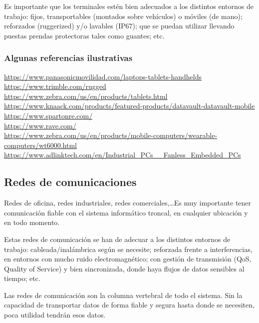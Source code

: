 \documentclass[spanish,12pt,a4paper,final,oneside]{book}
\begin{document}
Es importante que los terminales estén bien adecuados a los distintos entornos de trabajo: fijos, transportables (montados sobre vehículos) o móviles (de mano); reforzados (ruggerized) y/o lavables (IP67); que se puedan utilizar llevando puestas prendas protectoras tales como guantes; etc.

\subsubsection*{Algunas referencias ilustrativas}
\url{https://www.panasonicmovilidad.com/laptops-tablets-handhelds}
\\ \url{https://www.trimble.com/rugged}
\\ \url{https://www.zebra.com/us/en/products/tablets.html}
\\ \url{https://www.knaack.com/products/featured-products/datavault-datavault-mobile}
\\ \url{https://www.spartonre.com/}
\\ \url{https://www.rave.com/}
\\ \url{https://www.zebra.com/us/en/products/mobile-computers/wearable-computers/wt6000.html}
\\ \url{https://www.adlinktech.com/en/Industrial_PCs__Fanless_Embedded_PCs}

\subsection{Redes de comunicaciones} \label{redes_de_comunicaciones}
Redes de oficina, redes industriales, redes comerciales,\ldots Es muy importante tener comunicación fiable con el sistema informático troncal, en cualquier ubicación y en todo momento.

Estas redes de comunicación se han de adecuar a los distintos entornos de trabajo: cableada/inalámbrica según se necesite; reforzada frente a interferencias, en entornos con mucho ruido electromagnético; con gestión de transmisión (QoS, Quality of Service) y bien sincronizada, donde haya flujos de datos sensibles al tiempo; etc.

Las redes de comunicación son la columna vertebral de todo el sistema. Sin la capacidad de transportar datos de forma fiable y segura hasta donde se necesiten, poca utilidad tendrán esos datos.
\end{document}
